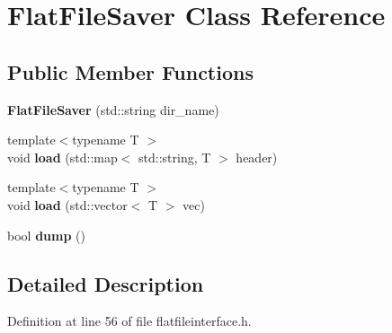 \hypertarget{class_flat_file_saver}{}\section{Flat\+File\+Saver Class Reference}
\label{class_flat_file_saver}
\subsection*{Public Member Functions}
\begin{DoxyCompactItemize}
\item 
{\bfseries Flat\+File\+Saver} (std\+::string dir\+\_\+name)\hypertarget{class_flat_file_saver_a1778a44559f342a2c102842a58c9866b}{}\label{class_flat_file_saver_a1778a44559f342a2c102842a58c9866b}

\item 
{\footnotesize template$<$typename T $>$ }\\void {\bfseries load} (std\+::map$<$ std\+::string, T $>$ header)\hypertarget{class_flat_file_saver_a8914a6ba17ea3b6e4891af8138b518bb}{}\label{class_flat_file_saver_a8914a6ba17ea3b6e4891af8138b518bb}

\item 
{\footnotesize template$<$typename T $>$ }\\void {\bfseries load} (std\+::vector$<$ T $>$ vec)\hypertarget{class_flat_file_saver_a7b14fc970538db6d07fc132c212b3225}{}\label{class_flat_file_saver_a7b14fc970538db6d07fc132c212b3225}

\item 
bool {\bfseries dump} ()\hypertarget{class_flat_file_saver_af7b235135124fe78ec3f60d531ea9200}{}\label{class_flat_file_saver_af7b235135124fe78ec3f60d531ea9200}

\end{DoxyCompactItemize}


\subsection{Detailed Description}


Definition at line 56 of file flatfileinterface.\+h.

